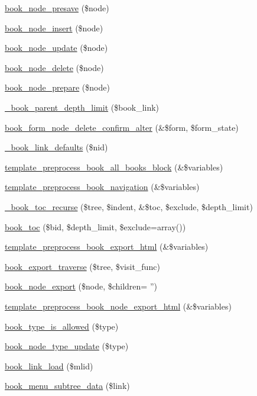 \begin{DoxyCompactItemize}
\item 
\hyperlink{book_8module_a3d41122daff1649b12fe2d099aa34711}{book\_\-node\_\-presave} (\$node)
\item 
\hyperlink{book_8module_a081b24827473612bc5d7f7f918a4951a}{book\_\-node\_\-insert} (\$node)
\item 
\hyperlink{book_8module_a2584e02b999649d42f6b8ad5204348e8}{book\_\-node\_\-update} (\$node)
\item 
\hyperlink{book_8module_a67c976b971f2fe6d96cee6cf697268be}{book\_\-node\_\-delete} (\$node)
\item 
\hyperlink{book_8module_a8a8ea6d87c29a8bf3e88ade3f1df6551}{book\_\-node\_\-prepare} (\$node)
\item 
\hyperlink{book_8module_a39e03999837b65e5a74906dd1f897850}{\_\-book\_\-parent\_\-depth\_\-limit} (\$book\_\-link)
\item 
\hyperlink{book_8module_a0b42d6b8b360c3fde824b6966e11eb0c}{book\_\-form\_\-node\_\-delete\_\-confirm\_\-alter} (\&\$form, \$form\_\-state)
\item 
\hyperlink{book_8module_acbbb591a09116e8fc049489d66778474}{\_\-book\_\-link\_\-defaults} (\$nid)
\item 
\hyperlink{book_8module_a57d4d9c4e795c96dc9828781404fc577}{template\_\-preprocess\_\-book\_\-all\_\-books\_\-block} (\&\$variables)
\item 
\hyperlink{book_8module_aa5d42034a0e369d49bb21ae74409e9fa}{template\_\-preprocess\_\-book\_\-navigation} (\&\$variables)
\item 
\hyperlink{book_8module_a3212bd000878f6a7cafb2a6561d2e80b}{\_\-book\_\-toc\_\-recurse} (\$tree, \$indent, \&\$toc, \$exclude, \$depth\_\-limit)
\item 
\hyperlink{book_8module_a36327566aaf222eb728c9aa69b554e69}{book\_\-toc} (\$bid, \$depth\_\-limit, \$exclude=array())
\item 
\hyperlink{book_8module_ac66a30414a0cb26861b69beeab40a63d}{template\_\-preprocess\_\-book\_\-export\_\-html} (\&\$variables)
\item 
\hyperlink{book_8module_a3cbdd5e26bcca034837e7a4b04f6641b}{book\_\-export\_\-traverse} (\$tree, \$visit\_\-func)
\item 
\hyperlink{book_8module_ae395cbe677fd3e99501cd0177d89020b}{book\_\-node\_\-export} (\$node, \$children= '')
\item 
\hyperlink{book_8module_acff8a6be50ab7378ef08da71ddd6b656}{template\_\-preprocess\_\-book\_\-node\_\-export\_\-html} (\&\$variables)
\item 
\hyperlink{book_8module_adf79a6a651254abd81342a60c5321008}{book\_\-type\_\-is\_\-allowed} (\$type)
\item 
\hyperlink{book_8module_a0bd6c2cb484f03c2c190aefd4f550ef7}{book\_\-node\_\-type\_\-update} (\$type)
\item 
\hyperlink{book_8module_a996cf515cb6eb772f4190c144016c2bb}{book\_\-link\_\-load} (\$mlid)
\item 
\hyperlink{book_8module_a7ffceea31e765d8e83432f33b987f2b2}{book\_\-menu\_\-subtree\_\-data} (\$link)
\end{DoxyCompactItemize}


